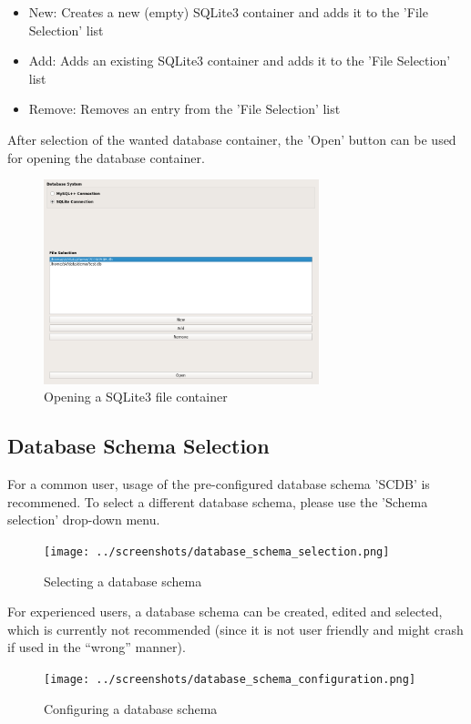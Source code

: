 \begin{itemize}  
\item New: Creates a new (empty) SQLite3 container and adds it to the 'File Selection' list
\item Add: Adds an existing  SQLite3 container and adds it to the 'File Selection' list
\item Remove: Removes an entry from the 'File Selection' list
\end{itemize}

After selection of the wanted database container, the 'Open' button can be used for opening the database container.

\begin{figure}[H]
  \center
    \includegraphics[width=8cm,frame]{../screenshots/sqlite3_open.png}
  \caption{Opening a SQLite3 file container}
  \label{fig:sqlite3_open}
\end{figure}

\subsection{Database Schema Selection}
For a common user, usage of the pre-configured database schema 'SCDB' is recommened. To select a different database schema, please use the 'Schema selection' drop-down menu.\\

\begin{figure}[H]
  \center
    \texttt{[image: ../screenshots/database\_schema\_selection.png]}
  \caption{Selecting a database schema}
  \label{fig:db_schema_select}
\end{figure}

For experienced users, a database schema can be created, edited and selected, which is currently not recommended (since it is not user friendly and might crash if used in the ``wrong'' manner).

\begin{figure}[H]
  \hspace*{-1cm}
    \texttt{[image: ../screenshots/database\_schema\_configuration.png]}
  \caption{Configuring a database schema}
  \label{fig:db_schema_configuration}
\end{figure}

